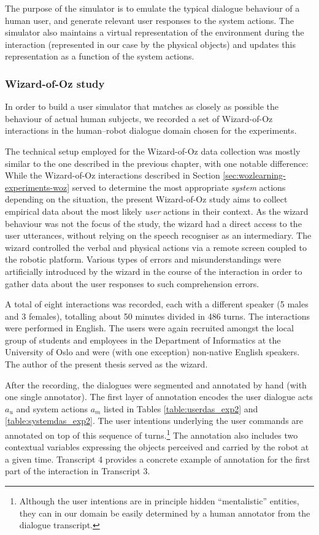 The purpose of the simulator is to emulate the typical dialogue behaviour of a human user, and generate relevant user responses to the system actions.  The simulator also maintains a virtual representation of the environment during the interaction (represented in our case by the physical objects) and updates this representation as a function of the system actions.


\subsubsection*{Wizard-of-Oz study}

In order to build a user simulator that matches as closely as possible the behaviour of actual human subjects, we recorded a set of Wizard-of-Oz interactions in the human--robot dialogue domain chosen for the experiments. 

The technical setup employed for the Wizard-of-Oz data collection was mostly similar to the one described in the previous chapter, with one notable difference:  While the Wizard-of-Oz interactions described in Section \ref{sec:wozlearning-experiments-woz} served to determine the most appropriate \textit{system} actions depending on the situation, the present Wizard-of-Oz study aims to collect empirical data about the most likely \textit{user} actions in their context.  As the wizard behaviour was not the focus of the study, the wizard had a direct access to the user utterances, without relying on the speech recogniser as an intermediary. The wizard controlled the verbal and physical actions via a remote screen coupled to the robotic platform. Various types of errors and misunderstandings were artificially introduced by the wizard in the course of the interaction in order to gather data about the user responses to such comprehension errors. 

A total of eight interactions was recorded, each with a different speaker (5 males and 3 females), totalling about 50 minutes divided in 486 turns.  The interactions were performed in English. The users were again recruited amongst the local group of students and employees in the Department of Informatics at the University of Oslo and were (with one exception) non-native English speakers. The author of the present thesis served as the wizard. 

After the recording, the dialogues were segmented and annotated by hand (with one single annotator). The first layer of annotation encodes the user dialogue acts $a_u$ and system actions $a_m$ listed in Tables \ref{table:userdas_exp2} and \ref{table:systemdas_exp2}. The user intentions underlying the user commands are annotated on top of this sequence of turns.\footnote{Although the user intentions are in principle hidden ``mentalistic'' entities, they can in our domain be easily determined by a human annotator from the dialogue transcript.} The annotation also includes two contextual variables expressing the objects perceived and carried by the robot at a given time. Transcript 4 provides a concrete example of annotation for the first part of the interaction in Transcript 3. 

